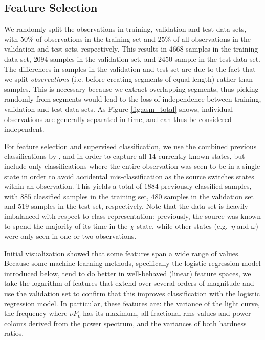 \documentclass[fleqn,usenatbib]{mnras}
\begin{document}
\subsection{Feature Selection}
\label{sec:featureselection}

We randomly split the observations in training, validation and test data sets, with $50\%$ of observations in the training set and $25\%$ of all observations in the validation and test sets, respectively. This results in $4668$ samples in the training data set, $2094$ samples in the validation set, and $2450$ sample in the test data set. The differences in samples in the validation and test set are due to the fact that we split \textit{observations} (i.e. before creating segments of equal length) rather than samples. This is necessary because we extract overlapping segments, thus picking randomly from segments would lead to the loss of independence between training, validation and test data sets. As Figure \ref{fig:asm_total} shows, individual observations are generally separated in time, and can thus be considered independent.

For feature selection and supervised classification, we use the combined previous classifications by \citet{belloni2000}, \citet{kleinwolt2002} and \citet{hannikainen2003} in order to capture all $14$ currently known states, but include only classifications where the entire observation was seen to be in a single state in order to avoid accidental mis-classification as the source switches states within an observation. This yields a total of $1884$ previously classified samples, with $885$ classified samples in the training set, $480$ samples in the validation set and $519$ samples in the test set, respectively. Note that the data set is heavily imbalanced with respect to class representation: previously, the source was known to spend the majority of its time in the $\chi$ state, while other states (e.g.\ $\eta$ and $\omega$) were only seen in one or two observations. 

Initial visualization showed that some features span a wide range of values. Because some machine learning methods, specifically the logistic regression model introduced below, tend to do better in well-behaved (linear) feature spaces, we take the logarithm of features that extend over several orders of magnitude and use the validation set to confirm that this improves classification with the logistic regression model. In particular, these features are: the variance of the light curve, the frequency where $\nu P_\nu$ has its maximum, all fractional rms values and power colours derived from the power spectrum, and the variances of both hardness ratios. 
\end{document}
